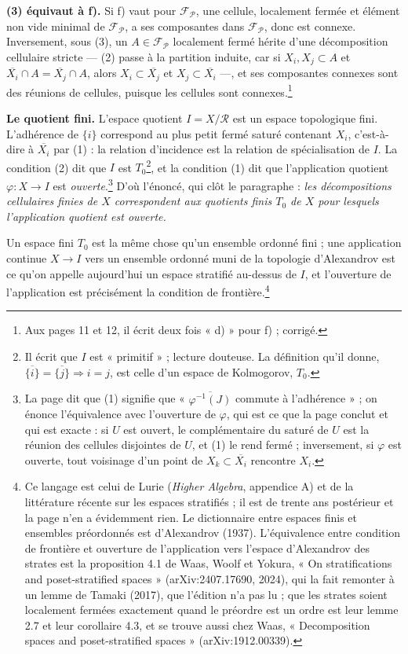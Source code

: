 \documentclass[11pt,a4paper]{article}
\begin{document}
\textbf{(3) équivaut à f).} Si f) vaut pour $\mathcal{F}_{\mathcal{P}}$, une
cellule, localement fermée et élément non vide minimal de
$\mathcal{F}_{\mathcal{P}}$, a ses composantes dans $\mathcal{F}_{\mathcal{P}}$,
donc est connexe. Inversement, sous (3), un $A \in \mathcal{F}_{\mathcal{P}}$
localement fermé hérite d'une décomposition cellulaire stricte — (2) passe à
la partition induite, car si $X_i, X_j \subset A$ et $\overline{X_i} \cap A =
\overline{X_j} \cap A$, alors $X_i \subset \overline{X_j}$ et $X_j \subset
\overline{X_i}$ —, et ses composantes connexes sont des réunions de cellules,
puisque les cellules sont connexes.\footnote{Aux pages 11 et 12, il écrit deux
fois « d) » pour f) ; corrigé.}

\textbf{Le quotient fini.} L'espace quotient $I = X/\mathcal{R}$ est un espace
topologique fini. L'adhérence de $\{i\}$ correspond au plus petit fermé saturé
contenant $X_i$, c'est-à-dire à $\overline{X_i}$ par (1) : la relation
d'incidence est la relation de spécialisation de $I$. La condition (2) dit que
$I$ est $T_0$\footnote{Il écrit que $I$ est « primitif » ; lecture douteuse.
La définition qu'il donne, $\overline{\{i\}} = \overline{\{j\}} \Rightarrow
i = j$, est celle d'un espace de Kolmogorov, $T_0$.}, et la condition (1) dit
que l'application quotient $\varphi : X \to I$ est \emph{ouverte}.\footnote{La
page dit que (1) signifie que « $\overline{\varphi^{-1}(J)}$ commute à
l'adhérence » ; on énonce l'équivalence avec l'ouverture de $\varphi$, qui est
ce que la page conclut et qui est exacte : si $U$ est ouvert, le complémentaire
du saturé de $U$ est la réunion des cellules disjointes de $U$, et (1) le rend
fermé ; inversement, si $\varphi$ est ouverte, tout voisinage d'un point de
$X_k \subset \overline{X_i}$ rencontre $X_i$.} D'où l'énoncé, qui clôt le
paragraphe : \emph{les décompositions cellulaires finies de $X$ correspondent
aux quotients finis $T_0$ de $X$ pour lesquels l'application quotient est
ouverte.}

Un espace fini $T_0$ est la même chose qu'un ensemble ordonné fini ; une
application continue $X \to I$ vers un ensemble ordonné muni de la topologie
d'Alexandrov est ce qu'on appelle aujourd'hui un espace stratifié au-dessus de
$I$, et l'ouverture de l'application est précisément la condition de
frontière.\footnote{Ce langage est celui de Lurie (\emph{Higher Algebra},
appendice A) et de la littérature récente sur les espaces stratifiés ; il est
de trente ans postérieur et la page n'en a évidemment rien. Le dictionnaire
entre espaces finis et ensembles préordonnés est d'Alexandrov (1937).
L'équivalence entre condition de frontière et ouverture de l'application vers
l'espace d'Alexandrov des strates est la proposition 4.1 de Waas, Woolf et
Yokura, « On stratifications and poset-stratified spaces » (arXiv:2407.17690,
2024), qui la fait remonter à un lemme de Tamaki (2017), que l'édition n'a
pas lu ; que les strates soient localement fermées exactement quand le
préordre est un ordre est leur lemme 2.7 et leur corollaire 4.3, et se trouve
aussi chez Waas, « Decomposition spaces and poset-stratified spaces »
(arXiv:1912.00339).}
\end{document}
